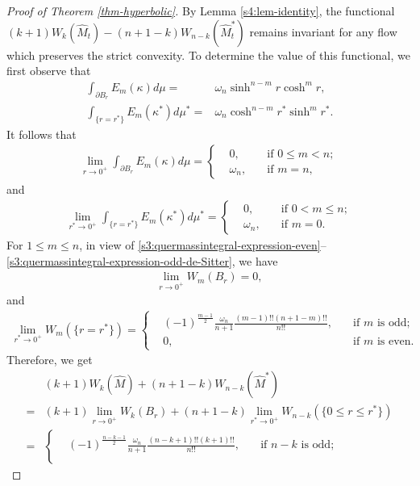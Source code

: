 \documentclass[11pt,reqno]{amsart}
\theoremstyle{definition}
\theoremstyle{remark}
\numberwithin{equation}{section}
\renewcommand{\(}{\left(}
\renewcommand{\)}{\right)}
\renewcommand{\~}{\tilde}
\renewcommand{\-}{\overline}
\renewcommand{\k}{\kappa}
\newcommand{\ra}{\rightarrow}
\begin{document}
\begin{proof}[Proof of Theorem \ref{thm-hyperbolic}]
    By Lemma \ref{s4:lem-identity}, the functional $(k+1)W_k(\hat{M}_t)-(n+1-k)W_{n-k}(\hat{M}_t^\ast)$ remains invariant for any flow which preserves the strict convexity. To determine the value of this functional, we first observe that 
    \begin{align*}
    \int_{\partial B_r}E_m(\k)d\mu=&\omega_n \sinh^{n-m}r \cosh^m r, \\ \int_{\{r=r^\ast\}}E_m(\k^\ast) d\mu^\ast=&\omega_n \cosh^{n-m} r^\ast \sinh^m r^\ast.
    \end{align*}
    It follows that 
    \begin{align*}
    \lim_{r\ra 0^+}\int_{\partial B_{r}} E_m(\k) d\mu=\left\{\begin{aligned}
    &0, \quad  &\text{if $0\leq m<n$};\\
    &\omega_n, \quad &\text{if $m=n$},
    \end{aligned}\right.
    \end{align*}
    and
    \begin{align*}
    \lim_{r^\ast \ra 0^{+}}\int_{\{r=r^\ast\}} E_m(\k^\ast) d\mu^\ast=\left\{\begin{aligned}
    &0, \quad  &\text{if $0<m\leq n$};\\
    &\omega_n, \quad &\text{if $m=0$}.
    \end{aligned}\right.
    \end{align*}
    For $1\leq m\leq n$, in view of \eqref{s3:quermassintegral-expression-even}--\eqref{s3:quermassintegral-expression-odd-de-Sitter}, we have
    \begin{align*}
    \lim_{r\ra 0^+}W_m(B_r)=0, 
    \end{align*}
    and
    \begin{align*}
    \lim_{r^\ast\ra 0^+}W_m(\{r=r^\ast\})=\left\{\begin{aligned} 
    &(-1)^\frac{m-1}{2}\frac{\omega_n}{n+1}\frac{(m-1)!!(n+1-m)!!}{n!!},  \quad &\text{if $m$ is odd};\\
    &0,  \quad &\text{if $m$ is even}.
    \end{aligned}  \right.
    \end{align*}
    Therefore, we get
    \begin{align*}
    &(k+1)W_k(\hat{M})+(n+1-k)W_{n-k}(\hat{M}^\ast)\\=&(k+1)\lim_{r\ra 0^+}W_k(B_r)+(n+1-k)\lim_{r^\ast \ra 0^+} W_{n-k}(\{0\leq r\leq r^\ast\})\\
    =&\left\{ \begin{aligned}
    &(-1)^\frac{n-k-1}{2}\frac{\omega_n}{n+1}\frac{(n-k+1)!!(k+1)!!}{n!!},  \quad &\text{if $n-k$ is odd};\\

\end{aligned}
\end{align*}
\end{proof}
\end{document}
